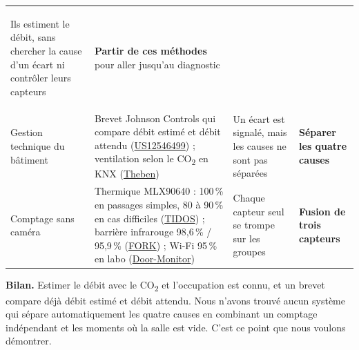 \documentclass[10pt,a4paper]{article}
\newcommand{\evol}[1]{\textcolor{vertok}{\textbf{#1}}}
\newcommand{\COtwo}{CO\textsubscript{2}}
\begin{document}
{\begin{xltabular}{\linewidth}{>{\bfseries\raggedright\arraybackslash}p{2.35cm} >{\raggedright\arraybackslash}X >{\raggedright\arraybackslash}p{3.1cm} >{\raggedright\arraybackslash}p{3.7cm}}
Ils estiment le débit, sans chercher la cause d'un écart ni contrôler leurs capteurs &
\evol{Partir de ces méthodes} pour aller jusqu'au diagnostic \\
\addlinespace[2pt]
Gestion technique du bâtiment &
Brevet Johnson Controls qui compare débit estimé et débit attendu (\href{https://patents.google.com/patent/US12546499B2/en}{US12546499}) ; ventilation selon le \COtwo{} en KNX (\href{https://www.knxtoday.com/2023/02/45412/theben-offers-clean-air-for-healthy-learning-with-theprema-p360-knx-multi\%EF\%BF\%BC.html}{Theben}) &
Un écart est signalé, mais les causes ne sont pas séparées &
\evol{Séparer les quatre causes} \\
\addlinespace[2pt]
Comptage sans caméra &
Thermique MLX90640 : 100\,\% en passages simples, 80 à 90\,\% en cas difficiles (\href{https://arxiv.org/abs/2004.05685}{TIDOS}) ; barrière infrarouge 98,6\,\% / 95,9\,\% (\href{https://users.ece.cmu.edu/~agr/resources/publications/RTAS-FORK-17.pdf}{FORK}) ; Wi-Fi 95\,\% en labo (\href{https://www.comp.polyu.edu.hk/~labimcl/paper/Yang-2019-IOTJ-Door-Monitor.pdf}{Door-Monitor}) &
Chaque capteur seul se trompe sur les groupes &
\evol{Fusion de trois capteurs} \\
\end{xltabular}
}

\textbf{Bilan.} Estimer le débit avec le \COtwo{} et l'occupation est connu, et un brevet compare déjà débit estimé et débit attendu. Nous n'avons trouvé aucun système qui sépare automatiquement les quatre causes en combinant un comptage indépendant et les moments où la salle est vide. C'est ce point que nous voulons démontrer.

\end{document}
